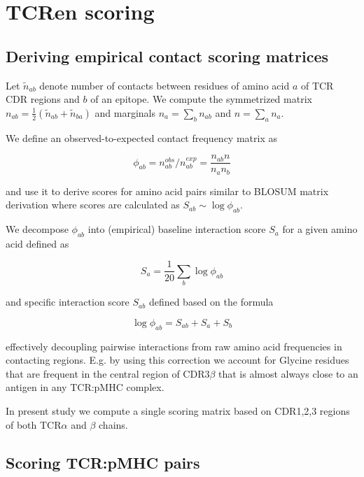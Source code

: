 \documentclass{article}
\begin{document}
\section{TCRen scoring}

\subsection{Deriving empirical contact scoring matrices} 

Let $\tilde{n}_{ab}$ denote number of contacts between residues of amino acid $a$ of TCR CDR regions and $b$ of an epitope. We compute the symmetrized matrix $n_{ab} = \frac{1}{2} \left(\tilde{n}_{ab} + \tilde{n}_{ba}\right)$ and marginals $n_a = \sum_{b} n_{ab}$ and $n = \sum_a n_{a}$.

We define an observed-to-expected contact frequency matrix as

\begin{equation}
\phi_{ab} = n^{obs}_{ab} /  n^{exp}_{ab} = \frac{n_{ab} n}{n_a n _b}
\end{equation}

and use it to derive scores for amino acid pairs similar to BLOSUM matrix derivation where scores are calculated as $S_{ab} \sim \log \phi_{ab}$.

We decompose $\phi_{ab}$ into (empirical) baseline interaction score $S_{a}$ for a given amino acid defined as

\begin{equation}
S_{a} = \frac{1}{20} \sum_{b} \log \phi_{ab}
\end{equation}

and specific interaction score $S_{ab}$ defined based on the formula

\begin{equation}
\log \phi_{ab}= S_{ab} + S_{a} + S_{b}
\end{equation}

effectively decoupling pairwise interactions from raw amino acid frequencies in contacting regions. E.g. by using this correction we account for Glycine residues that are frequent in the central region of CDR3$\beta$ that is almost always close to an antigen in any TCR:pMHC complex.

In present study we compute a single scoring matrix based on CDR1,2,3 regions of both TCR$\alpha$ and $\beta$ chains.

\subsection{Scoring TCR:pMHC pairs}
\end{document}
